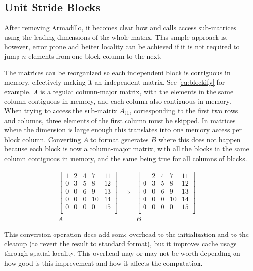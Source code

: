 \documentclass[../thesis]{subfiles}
\begin{document}
	\subsection{Unit Stride Blocks}
	\label{subsec:mic:optims:usb}

	After removing Armadillo, it becomes clear how \blas and \lapack calls access sub-matrices using the leading dimensions of the whole matrix. This simple approach is, however, error prone and better locality can be achieved if it is not required to jump $n$ elements from one block column to the next.

	The matrices can be reorganized so each independent block is contiguous in memory, effectively making it an independent matrix. See \cref{eq:blockify} for example. $A$ is a regular column-major matrix, with the elements in the same column contiguous in memory, and each column also contiguous in memory. When trying to access the sub-matrix $A_{11}$, corresponding to the first two rows and columns, three elements of the first column must be skipped. In matrices where the dimension is large enough this translates into one memory access per block column. Converting $A$ to \usb format generates $B$ where this does not happen because each block is now a column-major matrix, with all the blocks in the same column contiguous in memory, and the same being true for all columns of blocks.

	\begin{equation}
		\begin{array}{ccc}
			\left[
			\begin{array}{c|c|c|c|c}
				 1 &  2 &  4 &  7 & 11  \\
				 0 &  3 &  5 &  8 & 12  \\
				 0 &  0 &  6 &  9 & 13  \\
				 0 &  0 &  0 & 10 & 14  \\
				 0 &  0 &  0 &  0 & 15  \\
			\end{array}
			\right] & \Rightarrow & \left[
			\begin{array}{cc|cc|c}
				 1 &  2 &  4 &  7 & 11  \\
				 0 &  3 &  5 &  8 & 12  \\
				 \hline
				 0 &  0 &  6 &  9 & 13  \\
				 0 &  0 &  0 & 10 & 14  \\
				 \hline
				 0 &  0 &  0 &  0 & 15  \\
			\end{array}
			\right] \\
			A & & B
		\end{array}
		\label{eq:usb}
	\end{equation}

	This conversion operation does add some overhead to the initialization and to the cleanup (to revert the result to standard format), but it improves cache usage through spatial locality. This overhead may or may not be worth depending on how good is this improvement and how it affects the computation.
\end{document}
